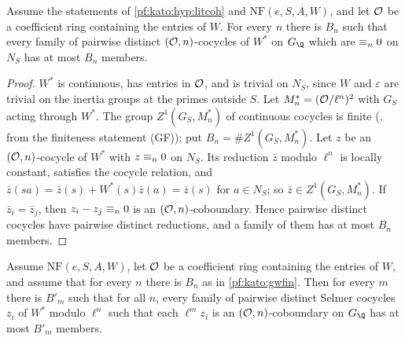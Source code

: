 \begin{lemma}\label{pf:kato:gwfin}
Assume the statements of \cref{pf:kato:hyp:litcoh} and $\mathrm{NF}(e,S,A,W)$, and let $\mathcal{O}$ be a coefficient ring containing the
entries of $W$. For every $n$ there is $B_n$ such that every family of pairwise distinct $(\mathcal{O},n)$-cocycles of $W^*$ on $G_\Q$ which are
$\equiv_{n}0$ on $N_S$ has at most $B_n$ members.
\end{lemma}

\begin{proof}
$W^*$ is continuous, has entries in $\mathcal{O}$, and is trivial on $N_S$, since $W$ and $\varepsilon$ are trivial on the inertia groups at the
primes outside $S$. Let $M_n^*=(\mathcal{O}/\ell^n)^2$ with $G_S$ acting through $W^*$. The group $Z^1(G_S,M_n^*)$ of continuous cocycles is finite
(, from the finiteness statement (GF)); put $B_n=\#Z^1(G_S,M_n^*)$. Let
$z$ be an $(\mathcal{O},n)$-cocycle of $W^*$ with $z\equiv_{n}0$ on $N_S$. Its reduction $\bar z$ modulo $\ell^n$ is locally constant, satisfies the
cocycle relation, and $\bar z(sa)=\bar z(s)+W^*(s)\bar z(a)=\bar z(s)$ for $a\in N_S$; so $\bar z\in Z^1(G_S,M_n^*)$. If $\bar z_i=\bar z_j$, then
$z_i-z_j\equiv_{n}0$ is an $(\mathcal{O},n)$-coboundary. Hence pairwise distinct cocycles have pairwise distinct reductions, and a family of them
has at most $B_n$ members.
\end{proof}

\begin{lemma}\label{pf:kato:torsbound}
Assume $\mathrm{NF}(e,S,A,W)$, let $\mathcal{O}$ be a coefficient ring containing the entries of $W$, and assume that for every $n$ there is
$B_n$ as in \cref{pf:kato:gwfin}. Then for every $m$ there is $B'_m$ such that for all $n$, every family of pairwise distinct Selmer
cocycles $z_i$ of $W^*$ modulo $\ell^n$ such that each $\ell^mz_i$ is an $(\mathcal{O},n)$-coboundary on $G_\Q$ has at most $B'_m$ members.
\end{lemma}

